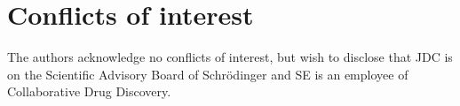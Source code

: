 \documentclass[aps,pre,twocolumn,nofootinbib,superscriptaddress,linenumbers]{revtex4-1}
\begin{document}
\section{Conflicts of interest}
\label{section:conflicts-of-interest}

The authors acknowledge no conflicts of interest, but wish to disclose that JDC is on the Scientific Advisory Board of Schr\"{o}dinger and SE is an employee of Collaborative Drug Discovery.


 

\end{document}
